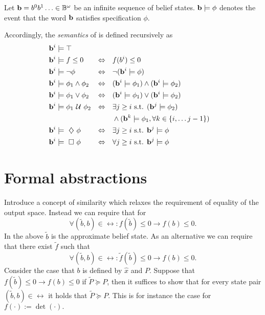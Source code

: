 \documentclass[conference]{IEEEtran}
\begin{document}
    \begin{definition}
    \label{def:gdtl-semantics}
    Let $\mathbf{b} = b^0b^1 \ldots \in \mathbb{B}^{\omega}$
    be an infinite sequence of belief states. $\mathbf{b} \models \phi$ denotes the event that the word $\mathbf{b}$ satisfies specification $\phi$.
    
     Accordingly, the {\em semantics} of \DTL is defined recursively as
    \begin{align*}
    &\BF{b}^i \models  \top  & \\
    &\BF{b}^i \models f \leq 0 & \Equiv\quad & f(b^i) \leq 0\\ %
    &\BF{b}^i \models \notltl \phi & \Equiv\quad & \notltl (\BF{b}^i \models \phi) \\
    &\BF{b}^i \models \phi_1 \andltl  \phi_2  & \Equiv\quad & ( \BF{b}^i \models \phi_1 ) \andltl ( \BF{b}^i \models \phi_2 ) \\
    &\BF{b}^i \models \phi_1 \orltl  \phi_2  & \Equiv\quad & ( \BF{b}^i \models \phi_1 ) \orltl ( \BF{b}^i \models \phi_2 ) \\
    &\BF{b}^i \models  \phi_1 \Until \phi_2 & \Equiv\quad & \exists j \geq i \text{ s.t. } ( \BF{b}^j \models \phi_2 ) \\
    & & & \andltl (\BF{b}^k \models \phi_1, \forall k \in \{i, \ldots j-1\})\\
    &\BF{b}^i \models \Event \phi  & \Equiv\quad & \exists j \geq i \text{ s.t. } \BF{b}^j \models \phi \\
    &\BF{b}^i \models \Always \phi  & \Equiv\quad & \forall j \geq i \text{ s.t. } \BF{b}^j \models \phi
    \end{align*}
    
    \end{definition}



\section{Formal abstractions}

 Introduce a concept of similarity which relaxes the requirement of equality of the output space. 
 Instead we can  require that for 
 \[\forall (\tilde b,b)\in \rel: f(\tilde b)\leq 0\rightarrow f( b)\leq 0.\]
In the above  $\tilde b$ is the approximate belief state. 
As an alternative we can require that there exist  $\tilde f$ such that
 \[\forall (\tilde b,b)\in \rel: \tilde f(\tilde b)\leq 0\rightarrow f( b)\leq 0.\]
  Consider the case that $b$ is defined by $\hat x$ and $P$. Suppose that  
 $f(\tilde b)\leq 0\rightarrow f( b)\leq 0$ if  $\tilde P\succeq P$, then it suffices to show that
 for every state pair  $ (\tilde b,b)\in \rel$ it holds that $\tilde P\succeq P$. This is for instance the case for $f(\cdot):=\det(\cdot).$
 
\end{document}
